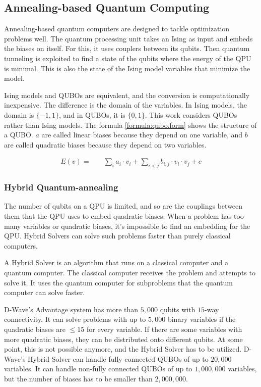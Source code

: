 \subsection{Annealing-based Quantum Computing}
\label{backg:annealing}

Annealing-based quantum computers are designed to tackle optimization problems well.
The quantum processing unit takes an Ising as input and embeds the biases on itself.
For this, it uses couplers between its qubits.
Then quantum tunneling is exploited to find a state of the qubits where the energy of the QPU is minimal.
This is also the state of the Ising model variables that minimize the model.
\cite{Boixo2013}

Ising models and QUBOs are equivalent, and the conversion is computationally inexpensive.
The difference is the domain of the variables.
\cite{Bian2010}
In Ising models, the domain is $\{-1, 1\}$, and in QUBOs, it is $\{0, 1\}$.
This work considers QUBOs rather than Ising models.
The formula \ref{formula:qubo.form} shows the structure of a QUBO.
$a$ are called linear biases because they depend on one variable, and $b$ are called quadratic biases because they depend on two variables.

\begin{align}
  \label{formula:qubo.form}
  E(v) = & \quad
  \sum_i a_i \cdot v_i
  + \sum_{i < j} b_{i, j} \cdot v_i \cdot v_j
  + c
\end{align}

\subsubsection{Hybrid Quantum-annealing}

The number of qubits on a QPU is limited, and so are the couplings between them that the QPU uses to embed quadratic biases.
When a problem has too many variables or quadratic biases, it's impossible to find an embedding for the QPU.
Hybrid Solvers can solve such problems faster than purely classical computers.
\cite{Bernoudy2020}

A Hybrid Solver is an algorithm that runs on a classical computer and a quantum computer.
The classical computer receives the problem and attempts to solve it.
It uses the quantum computer for subproblems that the quantum computer can solve faster.
\cite{Zhang2016}

D-Wave's Advantage system has more than $5, 000$ qubits with $15$-way connectivity.
\cite{D-Wave2020}
It can solve problems with up to $5, 000$ binary variables if the quadratic biases are $\leq 15$ for every variable.
If there are some variables with more quadratic biases, they can be distributed onto different qubits.
At some point, this is not possible anymore, and the Hybrid Solver has to be utilized.
D-Wave's Hybrid Solver can handle fully connected QUBOs of up to $20, 000$ variables.
It can handle non-fully connected QUBOs of up to $1, 000, 000$ variables, but the number of biases has to be smaller than $2, 000, 000$.
\cite{Bernoudy2020}

